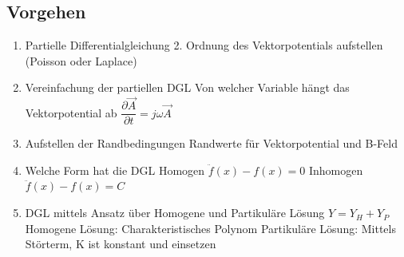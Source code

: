 \subsection{Vorgehen}
	\begin{enumerate}
		\item Partielle Differentialgleichung 2. Ordnung des Vektorpotentials aufstellen (Poisson oder Laplace)
		\item Vereinfachung der partiellen DGL
		\subitem Von welcher Variable hängt das Vektorpotential ab
		\subitem $\dfrac{\partial \vec{A}}{\partial t}= j\omega\vec{A} $
		\item Aufstellen der Randbedingungen
		\subitem Randwerte für Vektorpotential und B-Feld
		\item Welche Form hat die DGL 
		\subitem Homogen $\ddot{f}(x) - f(x)=0$
		\subitem Inhomogen $\ddot{f}(x) - f(x)=C$
		\item DGL mittels Ansatz über Homogene und Partikuläre Lösung $Y=Y_{H}+Y_{P}$
		\subitem Homogene Lösung: Charakteristisches Polynom
		\subitem Partikuläre Lösung: Mittels Störterm, K ist konstant und einsetzen
	\end{enumerate}
\clearpage
\pagebreak
